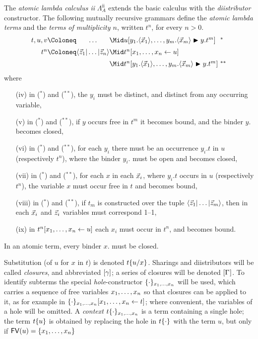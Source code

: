 \documentclass{amsart}
\begin{document}
\begin{definition}
\label{def:atomic calculus}
The \emph{atomic lambda calculus ii} $\Lambda_A^{\mathrm{ii}}$ extends the basic calculus with the \emph{diistributor} constructor.
%
The following mutually recursive grammars define the \emph{atomic lambda terms} and the \emph{terms of multiplicity $n$}, written $t^n$, for every $n>0$. 
%
\setMidspace{10pt}
%
\[
\begin{array}{@{}r@{}c@{}l@{~}l@{}}
			t,u,v \Coloneq & \ldots  & \Mid u\diistr*{y_1.\tup*{\vv*x_1},\ldots,y_m.\tup*{\vv*x_m}}y{t^m}	 & ^*
\\[5pt]		t^n   \Coloneq & \ttup*z & \Mid t^n\share xu
\\[5pt]							   && \Mid t^n\diistr*{y_1.\tup*{\vv*x_1},\ldots,y_m.\tup*{\vv*x_m}}y{t^m}	 & ^{**}
\end{array}
\]
%
where 
\begin{itemize}
	\item[(iv)] in ($^*$) and ($^{**}$), the $y_i$ must be distinct, and distinct from any occurring variable,
	\item[(v)]  in ($^*$) and ($^{**}$), if $y$ occurs free in $t^m$ it becomes bound, and the binder $y.$ becomes closed,
	\item[(vi)] in ($^*$) and ($^{**}$), for each $y_i$ there must be an occurrence $y_i.t$ in $u$ (respectively $t^n$), where the binder $y_i.$ must be open and becomes closed,
	\item[(vii)] in ($^*$) and ($^{**}$), for each $x$ in each $\vv*x_i$, where $y_i.t$ occurs in $u$ (respectively $t^n$), the variable $x$ must occur free in $t$ and becomes bound, 
	\item[(viii)] in ($^*$) and ($^{**}$), if $t_m$ is constructed over the tuple $\ttup*[m]z$, then in each $\vv*x_i$ and $\vv*z_i$ variables must correspond 1--1,
	\item[(ix)] in $t^n\share xu$ each $x_i$ must occur in $t^n$, and becomes bound.
\end{itemize}
%
In an atomic term, every binder $x.$ must be closed.
%
\end{definition}



Substitution (of $u$ for $x$ in $t$) is denoted $t\sub xu$.
%
Sharings and diistributors will be called \emph{closures}, and abbreviated $\g$; a series of closures will be denoted $\G$.
%
To identify subterms the special \emph{hole}-constructor $\cxt[\vv x]$ will be used, which carries a sequence of free variables $\vv x$ so that closures can be applied to it, as for example in $\cxt[\vv x]\share xt$; where convenient, the variables of a hole will be omitted.
%
A \emph{context} $t\cxt[\vv x]$ is a term containing a single hole; the term $t\cxt*u$ is obtained by replacing the hole in $t\cxt$ with the term $u$, but only if $\FV(u)=\{\vv x\}$
\end{document}
